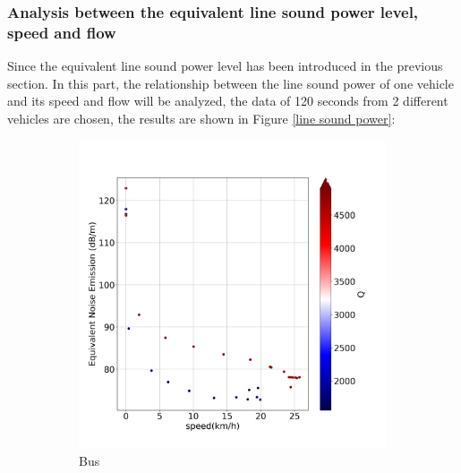 \documentclass{article}
\begin{document}
\subsubsection{Analysis between the equivalent line sound power level, speed and flow }
\noindent Since the equivalent line sound power level has been introduced in the previous section. In this part, the relationship between the line sound power of one vehicle and its speed and flow will be analyzed, the data of 120 seconds from 2 different vehicles are chosen, the results are shown in Figure \ref{line sound power}:
\begin{figure}[h]
     \centering
     \begin{subfigure}[h]{0.47\textwidth}
         \centering
         \includegraphics[width=\textwidth]{emission-speed-flow(bus).png}
         \caption{Bus}
         \label{R2L}
     \end{subfigure}
     \hfill
     \begin{subfigure}[h]{0.47\textwidth}
         \centering

\end{subfigure}
\end{figure}
\end{document}
